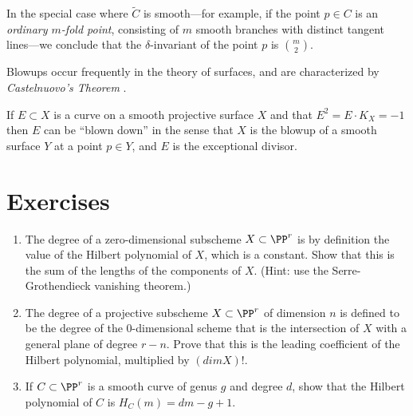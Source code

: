 In the special case where $\tilde C$ is smooth---for example, if the point $p \in C$ is an \emph{ordinary $m$-fold point}, consisting of $m$ smooth branches with distinct tangent lines---we conclude that the $\delta$-invariant of the point $p$ is $\binom{m}{2}$.


Blowups occur frequently in the theory of surfaces, and are characterized by \emph{Castelnuovo's Theorem} \cite[Theorem V.5.7]{Hartshorne1977}.

\begin{theorem}
If $E\subset X$ is a curve on a smooth projective surface $X$ and
 that $E^2 = E\cdot K_X = -1$ then $E$ can be ``blown down'' in the sense that
 $X$ is the blowup of a smooth surface $Y$ at a point $p\in Y$, and $E$ is the exceptional divisor.
\end{theorem}


\section{Exercises}


\begin{exercise}\label{characterization of degree}
\begin{enumerate}
\item The degree of a zero-dimensional subscheme $X\subset \PP^r$ is by definition the value of the Hilbert polynomial of $X$, which is a constant. Show that
this is the sum of the lengths of the components of $X$. (Hint: use the Serre-Grothendieck vanishing theorem.)

\item The degree of a projective subscheme $X\subset \PP^r$ of dimension $n$ is defined to be the degree of the $0$-dimensional scheme
that is the intersection of $X$ with a general plane of degree $r-n$. Prove that this is the leading coefficient of the Hilbert polynomial, multiplied
by $(dim X)!$.

\item If $C\subset \PP^r$ is a smooth curve of genus $g$ and degree $d$, show that the Hilbert polynomial of $C$ is $H_C(m) = dm-g+1$.
\end{enumerate}
\end{exercise}

